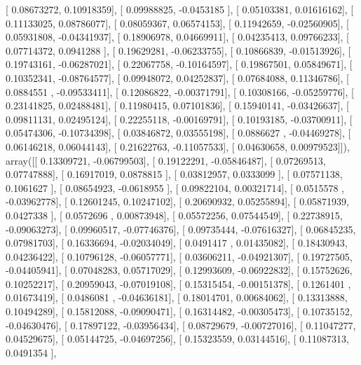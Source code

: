 \documentclass{article}
\begin{document}
       [ 0.08673272,  0.10918359],
       [ 0.09988825, -0.0453185 ],
       [ 0.05103381,  0.01616162],
       [ 0.11133025,  0.08786077],
       [ 0.08059367,  0.06574153],
       [ 0.11942659, -0.02560905],
       [ 0.05931808, -0.04341937],
       [ 0.18906978,  0.04669911],
       [ 0.04235413,  0.09766233],
       [ 0.07714372,  0.0941288 ],
       [ 0.19629281, -0.06233755],
       [ 0.10866839, -0.01513926],
       [ 0.19743161, -0.06287021],
       [ 0.22067758, -0.10164597],
       [ 0.19867501,  0.05849671],
       [ 0.10352341, -0.08764577],
       [ 0.09948072,  0.04252837],
       [ 0.07684088,  0.11346786],
       [ 0.0884551 , -0.09533411],
       [ 0.12086822, -0.00371791],
       [ 0.10308166, -0.05259776],
       [ 0.23141825,  0.02488481],
       [ 0.11980415,  0.07101836],
       [ 0.15940141, -0.03426637],
       [ 0.09811131,  0.02495124],
       [ 0.22255118, -0.00169791],
       [ 0.10193185, -0.03700911],
       [ 0.05474306, -0.10734398],
       [ 0.03846872,  0.03555198],
       [ 0.0886627 , -0.04469278],
       [ 0.06146218,  0.06044143],
       [ 0.21622763, -0.11057533],
       [ 0.04630658,  0.00979523]]), array([[ 0.13309721, -0.06799503],
       [ 0.19122291, -0.05846487],
       [ 0.07269513,  0.07747888],
       [ 0.16917019,  0.0878815 ],
       [ 0.03812957,  0.0333099 ],
       [ 0.07571138,  0.1061627 ],
       [ 0.08654923, -0.0618955 ],
       [ 0.09822104,  0.00321714],
       [ 0.0515578 , -0.03962778],
       [ 0.12601245,  0.10247102],
       [ 0.20690932,  0.05255894],
       [ 0.05871939,  0.0427338 ],
       [ 0.0572696 ,  0.00873948],
       [ 0.05572256,  0.07544549],
       [ 0.22738915, -0.09063273],
       [ 0.09960517, -0.07746376],
       [ 0.09735444, -0.07616327],
       [ 0.06845235,  0.07981703],
       [ 0.16336694, -0.02034049],
       [ 0.0491417 ,  0.01435082],
       [ 0.18430943,  0.04236422],
       [ 0.10796128, -0.06057771],
       [ 0.03606211, -0.04921307],
       [ 0.19727505, -0.04405941],
       [ 0.07048283,  0.05717029],
       [ 0.12993609, -0.06922832],
       [ 0.15752626,  0.10252217],
       [ 0.20959043, -0.07019108],
       [ 0.15315454, -0.00151378],
       [ 0.1261401 ,  0.01673419],
       [ 0.0486081 , -0.04636181],
       [ 0.18014701,  0.00684062],
       [ 0.13313888,  0.10494289],
       [ 0.15812088, -0.09090471],
       [ 0.16314482, -0.00305473],
       [ 0.10735152, -0.04630476],
       [ 0.17897122, -0.03956434],
       [ 0.08729679, -0.00727016],
       [ 0.11047277,  0.04529675],
       [ 0.05144725, -0.04697256],
       [ 0.15323559,  0.03144516],
       [ 0.11087313,  0.0491354 ],
\end{document}
